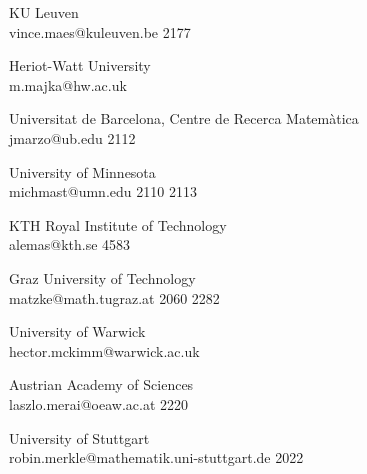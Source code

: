 \begin{multicols}{2}
 {KU Leuven\\}%
 {vince.maes@kuleuven.be}%
 {2177} %
 {} %
 {} %
 {} %
 {} %

 {Heriot-Watt University\\}%
 {m.majka@hw.ac.uk}%
 {} %
 {} %
 {} %
 {} %
 {} %

 {Universitat de Barcelona, Centre de Recerca Matem\`{a}tica\\}%
 {jmarzo@ub.edu}%
 {2112} %
 {} %
 {} %
 {} %
 {} %

 {University of Minnesota\\}%
 {michmast@umn.edu}%
 {2110} %
 {2113} %
 {} %
 {} %
 {} %

 {KTH Royal Institute of Technology\\}%
 {alemas@kth.se}%
 {4583} %
 {} %
 {} %
 {} %
 {} %

 {Graz University of Technology\\}%
 {matzke@math.tugraz.at}%
 {2060} %
 {2282} %
 {} %
 {} %
 {} %

 {University of Warwick\\}%
 {hector.mckimm@warwick.ac.uk}%
 {} %
 {} %
 {} %
 {} %
 {} %

 {Austrian Academy of Sciences\\}%
 {laszlo.merai@oeaw.ac.at}%
 {2220} %
 {} %
 {} %
 {} %
 {} %

 {University of Stuttgart\\}%
 {robin.merkle@mathematik.uni-stuttgart.de}%
 {2022} %
 {} %
 {} %
 {} %
 {} %


\end{multicols}
